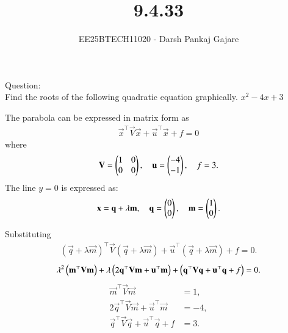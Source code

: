 \documentclass[journal,12pt,onecolumn]{IEEEtran}
\begin{document}
\title{9.4.33}
\author{EE25BTECH11020 - Darsh Pankaj Gajare}
{\let\newpage\relax\maketitle}
Question:\\ Find the roots of the following quadratic equation graphically.
$x^2-4x+3$\\
\solution

The parabola can be expressed in matrix form as
\begin{align}
	\vec{x}^\top \vec{V} \vec{x} + \vec{u}^\top\vec{x} + f = 0
\end{align}
where
\begin{align}
	\mathbf{V} = \begin{pmatrix}1 & 0 \\ 0 & 0\end{pmatrix}, \quad 
    \mathbf{u} = \begin{pmatrix}-4 \\ -1\end{pmatrix}, \quad 
    f = 3.
\end{align}
The line $y=0$ is expressed as:
\begin{align}
    \mathbf{x} = \mathbf{q} + \lambda \mathbf{m}, \quad 
    \mathbf{q} = \begin{pmatrix}0 \\ 0\end{pmatrix}, \quad 
    \mathbf{m} = \begin{pmatrix}1 \\ 0\end{pmatrix}.
\end{align}

Substituting
\begin{align}
	(\vec{q} + \lambda\vec{m})^\top \vec{V} (\vec{q} + \lambda\vec{m}) 
    + \vec{u}^\top(\vec{q} + \lambda\vec{m}) + f = 0.
\end{align}
\begin{align}
	\lambda^2 \left(\mathbf{m}^\top \mathbf{V} \mathbf{m}\right)
	+ \lambda \left(2\mathbf{q}^\top \mathbf{V} \mathbf{m} + \mathbf{u}^\top \mathbf{m}\right)
	+ \left(\mathbf{q}^\top \mathbf{V} \mathbf{q} + \mathbf{u}^\top \mathbf{q} + f\right) = 0.
\end{align}
\begin{align}
	\vec{m}^\top \vec{V} \vec{m} &= 1, \\
	2\vec{q}^\top \vec{V} \vec{m} + \vec{u}^\top \vec{m} &= -4, \\
	\vec{q}^\top \vec{V} \vec{q} + \vec{u}^\top \vec{q} + f &= 3.
\end{align}
\end{document}
